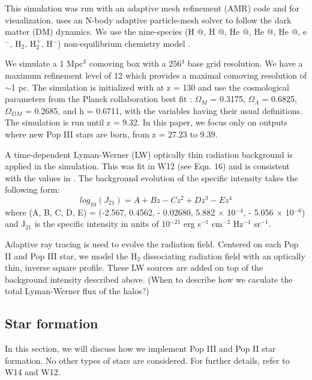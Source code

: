 \documentclass[a4paper,fleqn,usenatbib]{mnras}
\makeatletter
\newcommand*{\rom}[1]{\expandafter\@slowromancap\romannumeral #1@}
\makeatother
\begin{document}
This simulation was run with an adaptive mesh refinement (AMR) code 
\enzo{} \citep{Enzo} and \yt{} \citep{yt_full_paper} for visualization. \enzo{} uses an N-body adaptive particle-mesh solver \citep{Efstathiou85, Couchman91, BryanNorman1997} to follow the dark matter (DM) dynamics. We use the nine-species (H \rom{1}, H \rom{2}, He \rom{1}, He \rom{2}, He \rom{3}, e$^{-}$, H$_{2}$, H$_{2}^{+}$, H$^{-}$) non-equilibrium chemistry model \citep{Abel97, Anninos97}. 

We simulate a 1 Mpc$^{3}$ comoving box with a 256$^{3}$ base grid 
resolution. We have a maximum refinement level of 12 which provides a maximal comoving resolution of $\sim$1 pc. The simulation is 
initialized with \music{} \citep{Hahn11_MUSIC} at z = 130 and use the cosmological parameters from the Planck collaboration best fit 
\citet{Planck13_Cosmo}: $\Omega_{M}$ = 0.3175, $\Omega_{\Lambda}$ = 
0.6825, $\Omega_{DM}$ = 0.2685, and h = 0.6711, with the variables 
having their usual definitions. The simulation is run until z = 9.32. In this paper, we focus only on outputs where new Pop III stars are born, from z = 27.23 to 9.39. 

A time-dependent Lyman-Werner (LW) optically thin radiation background is applied in the simulation. This was fit in W12 (see Eqn. 16) and is consistent with the values in \citet{Trenti09_SFR}. The background evolution of the specific intensity takes the following form:
\begin{equation}
	log_{10}(J_{21}) = A + Bz - Cz^{2} + Dz^{3} - Ez^{4}
\end{equation}
where (A, B, C, D, E) = (-2.567, 0.4562, - 0.02680, 5.882 $\times$ 10$^{-4}$, - 5.056 $\times$ 10$^{-6}$) and J$_{21}$ is the specific intensity in units of 10$^{-21}$ erg s$^{-1}$ cm$^{-2}$ Hz$^{-1}$ sr$^{-1}$. 

Adaptive ray tracing \citep{Abel02_RT, Wise11_Moray} is used to evolve the radiation field. Centered on each Pop II and Pop III star, we model the H$_{2}$ dissociating radiation field with an optically thin, inverse square profile. These LW sources are added on top of the background intensity described above. (When to describe how we caculate the total Lyman-Werner flux of the halos?)
\subsection{Star formation}
In this section, we will discuss how we implement Pop III and Pop II 
star formation. No other types of stars are considered. For further 
details, refer to W14 and W12. 
\end{document}
